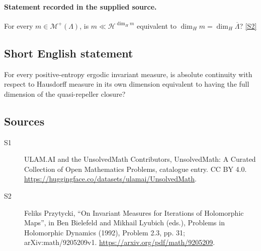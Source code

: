 \documentclass[11pt]{article}
\newcommand{\sref}[2]{\hyperlink{source:#1:#2}{[S#2]}}
\begin{document}
\paragraph{Statement recorded in the supplied source.}
For every $m\in\mathcal M^+(\Lambda)$, is $m\ll\mathcal H^{\dim_Hm}$ equivalent to $\dim_Hm=\dim_H\overline\Lambda$? \sref{statement}{2}
\subsection{Short English statement}
For every positive-entropy ergodic invariant measure, is absolute continuity with respect to Hausdorff measure in its own dimension equivalent to having the full dimension of the quasi-repeller closure?
\subsection{Sources}
\begin{description}
\item[\hypertarget{source:statement:1}{S1}] ULAM.AI and the UnsolvedMath Contributors, UnsolvedMath: A Curated Collection of Open Mathematics Problems, catalogue entry. CC BY 4.0. \url{https://huggingface.co/datasets/ulamai/UnsolvedMath}.
\item[\hypertarget{source:statement:2}{S2}] Feliks Przytycki, ``On Invariant Measures for Iterations of Holomorphic Maps'', in Ben Bielefeld and Mikhail Lyubich (eds.), Problems in Holomorphic Dynamics (1992), Problem 2.3, pp. 31; arXiv:math/9205209v1. \url{https://arxiv.org/pdf/math/9205209}.
\end{description}
\label{end:statement}
\end{document}
